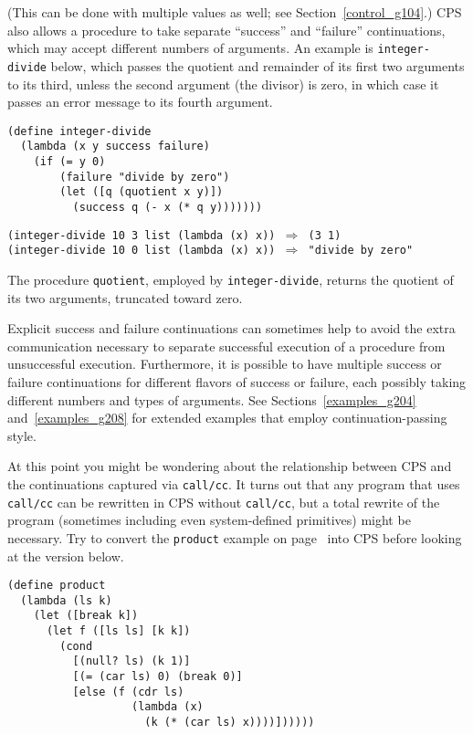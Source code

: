 (This can be done with multiple values as well; see Section \ref{control_g104}.)
CPS also allows a procedure to take separate ``success'' and
``failure'' continuations, which may accept different numbers of arguments.
An example is \label{further_s73}\texttt{integer-divide} below, which passes the quotient
and remainder of its first two arguments to its third, unless the
second argument (the divisor) is zero, in which case it passes an
error message to its fourth argument.


\begin{alltt}
(define integer-divide
  (lambda (x y success failure)
    (if (= y 0)
        (failure "divide by zero")
        (let ([q (quotient x y)])
          (success q (- x (* q y)))))))

(integer-divide 10 3 list (lambda (x) x)) \(\Rightarrow\) (3 1)
(integer-divide 10 0 list (lambda (x) x)) \(\Rightarrow\) "divide by zero"
\end{alltt}


The procedure \texttt{quotient}, employed by \texttt{integer-divide},
returns the quotient of its two arguments,
truncated toward zero.


Explicit success and failure continuations can sometimes
help to avoid the extra communication necessary to separate successful
execution of a procedure from unsuccessful execution.
Furthermore, it is possible to have multiple success or failure
continuations for different flavors of success or failure, each
possibly taking different numbers and types of arguments.
See Sections \ref{examples_g204} and \ref{examples_g208} for extended examples
that employ continuation-passing style.


At this point you might be wondering about the relationship between
CPS and the continuations captured via \texttt{call/cc}.
It turns out that any program that uses \texttt{call/cc} can be rewritten
in CPS without \texttt{call/cc}, but a total rewrite of the program
(sometimes including even system-defined primitives) might be
necessary.
Try to convert the \label{further_s74}\texttt{product} example on
page \pageref{further_defn_product_call_cc}
into CPS before looking at the version below.


\begin{alltt}
(define product
  (lambda (ls k)
    (let ([break k])
      (let f ([ls ls] [k k])
        (cond
          [(null? ls) (k 1)]
          [(= (car ls) 0) (break 0)]
          [else (f (cdr ls)
                   (lambda (x)
                     (k (* (car ls) x))))])))))
\end{alltt}


